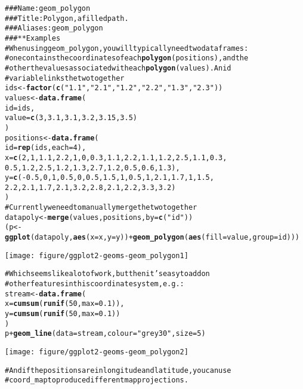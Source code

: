 \documentclass[a4paper,titlepage]{tufte-handout}\usepackage{graphicx, color}
\makeatletter
\def\maxwidth{ %
  \ifdim\Gin@nat@width>\linewidth
    \linewidth
  \else
    \Gin@nat@width
  \fi
}
\newcommand{\hlfunctioncall}[1]{\textcolor[rgb]{0.501960784313725,0,0.329411764705882}{\textbf{#1}}}%
\newcommand{\hlstring}[1]{\textcolor[rgb]{0.6,0.6,1}{#1}}%
\newcommand{\hlcomment}[1]{\textcolor[rgb]{0.180392156862745,0.6,0.341176470588235}{#1}}%
\newenvironment{kframe}{%
 \def\at@end@of@kframe{}%
 \ifinner\ifhmode%
  \def\at@end@of@kframe{\end{minipage}}%
  \begin{minipage}{\columnwidth}%
 \fi\fi%
 \def\FrameCommand##1{\hskip\@totalleftmargin \hskip-\fboxsep
 \colorbox{shadecolor}{##1}\hskip-\fboxsep
     \hskip-\linewidth \hskip-\@totalleftmargin \hskip\columnwidth}%
 \MakeFramed {\advance\hsize-\width
   \@totalleftmargin\z@ \linewidth\hsize
   \@setminipage}}%
 {\par\unskip\endMakeFramed%
 \at@end@of@kframe}
\newenvironment{knitrout}{}{} %
\makeatother
\begin{document}
\begin{knitrout}
\color{fgcolor}\begin{kframe}
\begin{alltt}
\hlcomment{### Name: geom_polygon}
\hlcomment{### Title: Polygon, a filled path.}
\hlcomment{### Aliases: geom_polygon}
\hlcomment{### ** Examples}
\hlcomment{# When using geom_polygon, you will typically need two data frames:}
\hlcomment{# one contains the coordinates of each \hlfunctioncall{polygon} (positions),  and the}
\hlcomment{# other the values associated with each \hlfunctioncall{polygon} (values).  An id}
\hlcomment{# variable links the two together}
ids <- \hlfunctioncall{factor}(\hlfunctioncall{c}(\hlstring{"1.1"}, \hlstring{"2.1"}, \hlstring{"1.2"}, \hlstring{"2.2"}, \hlstring{"1.3"}, \hlstring{"2.3"}))
values <- \hlfunctioncall{data.frame}(
  id = ids,
  value = \hlfunctioncall{c}(3, 3.1, 3.1, 3.2, 3.15, 3.5)
)
positions <- \hlfunctioncall{data.frame}(
  id = \hlfunctioncall{rep}(ids, each = 4),
  x = \hlfunctioncall{c}(2, 1, 1.1, 2.2, 1, 0, 0.3, 1.1, 2.2, 1.1, 1.2, 2.5, 1.1, 0.3,
  0.5, 1.2, 2.5, 1.2, 1.3, 2.7, 1.2, 0.5, 0.6, 1.3),
  y = \hlfunctioncall{c}(-0.5, 0, 1, 0.5, 0, 0.5, 1.5, 1, 0.5, 1, 2.1, 1.7, 1, 1.5,
  2.2, 2.1, 1.7, 2.1, 3.2, 2.8, 2.1, 2.2, 3.3, 3.2)
)
\hlcomment{# Currently we need to manually merge the two together}
datapoly <- \hlfunctioncall{merge}(values, positions, by=\hlfunctioncall{c}(\hlstring{"id"}))
(p <- \hlfunctioncall{ggplot}(datapoly, \hlfunctioncall{aes}(x=x, y=y)) + \hlfunctioncall{geom_polygon}(\hlfunctioncall{aes}(fill=value, group=id)))
\end{alltt}
\end{kframe}\texttt{[image: figure/ggplot2-geoms-geom\_polygon1]} \begin{kframe}\begin{alltt}
\hlcomment{# Which seems like a lot of work, but then it's easy to add on}
\hlcomment{# other features in this coordinate system, e.g.:}
stream <- \hlfunctioncall{data.frame}(
  x = \hlfunctioncall{cumsum}(\hlfunctioncall{runif}(50, max = 0.1)),
  y = \hlfunctioncall{cumsum}(\hlfunctioncall{runif}(50,max = 0.1))
)
p + \hlfunctioncall{geom_line}(data = stream, colour=\hlstring{"grey30"}, size = 5)
\end{alltt}
\end{kframe}\texttt{[image: figure/ggplot2-geoms-geom\_polygon2]} \begin{kframe}\begin{alltt}
\hlcomment{# And if the positions are in longitude and latitude, you can use}
\hlcomment{# coord_map to produce different map projections.}
\end{alltt}
\end{kframe}
\end{knitrout}
\end{document}
